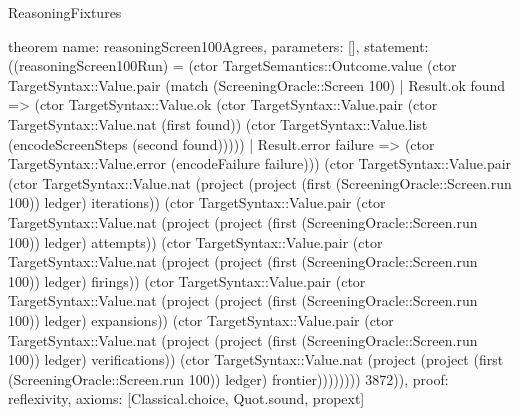 \begin{lexlean}{ReasoningFixtures}
\begin{semanticmodule}
theorem{
  name: reasoningScreen100Agrees,
  parameters: [],
  statement: ((reasoningScreen100Run) = (ctor TargetSemantics::Outcome.value (ctor TargetSyntax::Value.pair (match (ScreeningOracle::Screen 100)
    | Result.ok found => (ctor TargetSyntax::Value.ok (ctor TargetSyntax::Value.pair (ctor TargetSyntax::Value.nat (first found)) (ctor TargetSyntax::Value.list (encodeScreenSteps (second found)))))
    | Result.error failure => (ctor TargetSyntax::Value.error (encodeFailure failure))) (ctor TargetSyntax::Value.pair (ctor TargetSyntax::Value.nat (project (project (first (ScreeningOracle::Screen.run 100)) ledger) iterations)) (ctor TargetSyntax::Value.pair (ctor TargetSyntax::Value.nat (project (project (first (ScreeningOracle::Screen.run 100)) ledger) attempts)) (ctor TargetSyntax::Value.pair (ctor TargetSyntax::Value.nat (project (project (first (ScreeningOracle::Screen.run 100)) ledger) firings)) (ctor TargetSyntax::Value.pair (ctor TargetSyntax::Value.nat (project (project (first (ScreeningOracle::Screen.run 100)) ledger) expansions)) (ctor TargetSyntax::Value.pair (ctor TargetSyntax::Value.nat (project (project (first (ScreeningOracle::Screen.run 100)) ledger) verifications)) (ctor TargetSyntax::Value.nat (project (project (first (ScreeningOracle::Screen.run 100)) ledger) frontier)))))))) 3872)),
  proof: reflexivity{},
  axioms: [Classical.choice, Quot.sound, propext]
}


\end{semanticmodule}
\end{lexlean}
